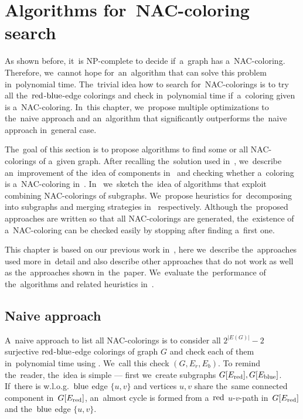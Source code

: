 \chapter{Algorithms for~NAC-coloring search}%
\label{chapter:algo}

\begin{chapterabstract}

	As shown before, it~is NP-complete to decide if~a~graph has a~NAC-coloring.
	Therefore, we~cannot hope for~an~algorithm that can solve this problem in~polynomial time.
	The~trivial idea how to search for~NAC-colorings is to
	try all the~\( \text{red} \)-\( \text{blue} \)-edge colorings
	and check in~polynomial time if~a~coloring given is a~NAC-coloring.
	In~this chapter, we~propose multiple optimizations to the~naive approach
	and an~algorithm that significantly outperforms the~naive approach in~general case.

\end{chapterabstract}

The~goal of this section is to propose algorithms to find some or all NAC-colorings of a~given graph.
After recalling the~solution used in~\flexrilog{},
we~describe an~improvement of the~idea of \trcon{} components in~
and checking whether a~coloring is a~NAC-coloring in~.
In~ we~sketch the~idea of algorithms that
exploit combining NAC-colorings of subgraphs.
We~propose heuristics for~decomposing into subgraphs and merging strategies
in~ respectively.
Although the~proposed approaches are written so that all NAC-colorings are generated,
the~existence of a~NAC-coloring can be checked easily by stopping after finding a~first one.

This chapter is based on our previous work in~\cite{my_paper},
here we~describe the~approaches used more in~detail
and also describe other approaches that do not work as well as the~approaches
shown in~the~paper. We~evaluate the~performance
of the~algorithms and related heuristics in~.

\section{Naive approach}

A~naive approach to list all NAC-colorings is to consider
all $2^{|E(G)|} - 2$ surjective \( \text{red} \)-\( \text{blue} \)-edge colorings of graph $G$
and check each of them in~polynomial time using .
We~call this check \IsNACColoring{}$(G, E_r, E_b)$.
To remind the~reader, the~idea is simple
--- first we~create subgraphs \( G[E_{\text{red}}], G[E_{\text{blue}}] \).
If~there is w.l.o.g.\ \( \text{blue} \) edge \( \{u, v\} \)
and vertices \( u, v \) share the~same connected component in~\( G[E_{\text{red}}] \),
an~almost cycle is formed from a~\( \text{red} \) \( u \)-\( v \)-path in~\( G[E_{\text{red}}] \)
and the~\( \text{blue} \) edge \( \{u, v\} \).

